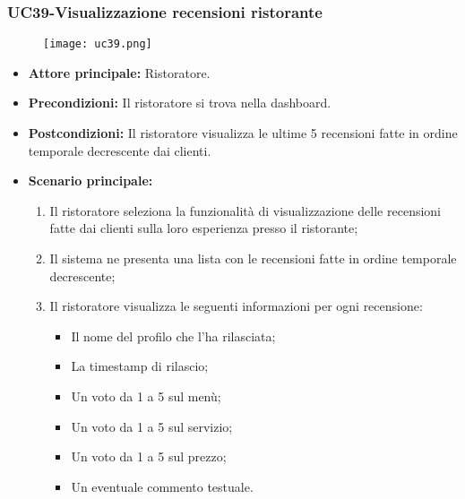 \subsubsection{UC39-Visualizzazione recensioni ristorante} %
\begin{figure}[h] \texttt{[image: uc39.png]} \end{figure}
\begin{itemize}
\item \textbf{Attore principale:} Ristoratore.
\item \textbf{Precondizioni:} Il ristoratore si trova nella dashboard.
\item \textbf{Postcondizioni:} Il ristoratore visualizza le ultime 5 recensioni fatte in ordine temporale decrescente dai clienti.
\item \textbf{Scenario principale:}
\begin{enumerate}
    \item Il ristoratore seleziona la funzionalità di visualizzazione delle recensioni fatte dai clienti sulla loro esperienza presso il ristorante;
    \item Il sistema ne presenta una lista con le recensioni fatte in ordine temporale decrescente;
    \item Il ristoratore visualizza le seguenti informazioni per ogni recensione:
    \begin{itemize}
        \item Il nome del profilo che l'ha rilasciata;
        \item La timestamp di rilascio;
        \item Un voto da 1 a 5 sul menù;
        \item Un voto da 1 a 5 sul servizio;
        \item Un voto da 1 a 5 sul prezzo;
        \item Un eventuale commento testuale.
    \end{itemize}
\end{enumerate}
\end{itemize}

